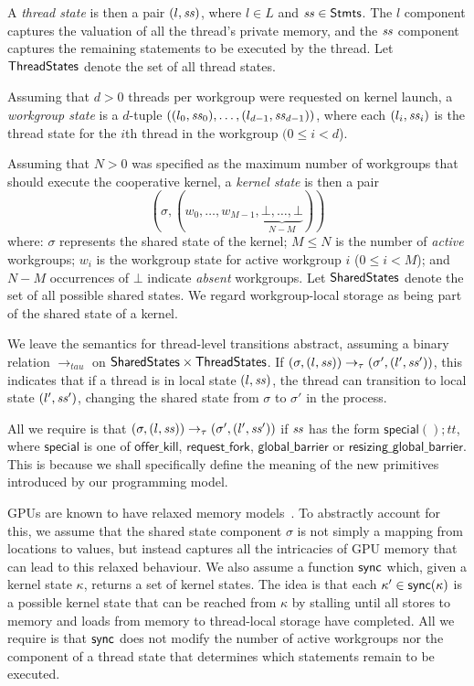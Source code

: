 \documentclass[parskip=half,sigconf,review, anonymous=true, acmcopyrightmode=none]{acmart}
\newcommand{\offerfork}{\mathsf{request\_fork}}
\newcommand{\offerkill}{\mathsf{offer\_kill}}
\newcommand{\globalbarrier}{\mathsf{global\_barrier}}
\newcommand{\resizingglobalbarrier}{\mathsf{resizing\_global\_barrier}}
\begin{document}
A \emph{thread state} is then a pair $(l, \mathit{ss})$, where $l \in L$ and
$\mathit{ss} \in \mathsf{Stmts}$.  The $l$ component captures the valuation of all the
thread's private memory, and the $\mathit{ss}$ component captures the
remaining statements to be executed by the thread.  Let $\mathsf{ThreadStates}$ denote the set of all thread states.

Assuming that $d > 0$ threads per workgroup were requested on kernel launch, a \emph{workgroup state}
is a $d$-tuple $((l_0, \mathit{ss}_0), \dots, (l_{d-1}, \mathit{ss}_{d-1}))$, where each $(l_i, \mathit{ss}_i)$ is the thread state for the $i$th thread in the workgroup $(0\leq i < d$).

Assuming that $N > 0$ was specified as the maximum number of
workgroups that should execute the cooperative kernel, a \emph{kernel
  state} is then a pair
%
\[
(\sigma, (w_0, \dots, w_{M-1}, \underbrace{\bot, \dots,
\bot}_{N-M}))\]
%
where: $\sigma$ represents the shared state of the kernel; $M \leq N$
is the number of \emph{active} workgroups; $w_i$ is the workgroup
state for active workgroup $i$ ($0 \leq i < M$); and $N-M$ occurrences
of $\bot$ indicate \emph{absent} workgroups.  Let $\mathsf{SharedStates}$
denote the set of all possible shared states.  We regard
workgroup-local storage as being part of the shared state of a kernel.

%
We leave the semantics for thread-level transitions abstract, assuming
a binary relation $\rightarrow_{tau}$ on $\mathsf{SharedStates}{} \times
\mathsf{ThreadStates}{}$.  If $(\sigma, (l, \mathit{ss})) \rightarrow_{\tau}
(\sigma', (l', \mathit{ss}'))$, this indicates that if a thread is in local
state $(l, \mathit{ss})$, the thread can transition to local state $(l',
\mathit{ss}')$, changing the shared state from $\sigma$ to $\sigma'$ in the
process.

All we require is that $(\sigma, (l, \mathit{ss})) \rightarrow_{\tau}
(\sigma', (l', \mathit{ss}'))$ if $\mathit{ss}$ has the form $\mathsf{special}();
\mathit{tt}$, where $\mathsf{special}$ is one of $\offerkill$,
$\offerfork$, $\globalbarrier$ or $\resizingglobalbarrier$.  This is
because we shall specifically define the meaning of the new primitives
introduced by our programming model.

%
GPUs are known to have relaxed memory models~\cite{ABDGKPSW-2015}.  To abstractly
account for this, we assume that the shared state component $\sigma$
is not simply a mapping from locations to values, but instead
captures all the intricacies of GPU memory that can lead to this
relaxed behaviour.  We also assume a function $\mathsf{sync}$ which, given a
kernel state $\kappa$, returns a set of kernel states.  The idea is
that each $\kappa' \in \mathsf{sync}(\kappa)$ is a possible kernel state that
can be reached from $\kappa$ by stalling until all stores to memory
and loads from memory to thread-local storage have completed.  All we
require is that $\mathsf{sync}$ does not modify the number of active
workgroups nor the component of a thread state that determines which
statements remain to be executed.
\end{document}
